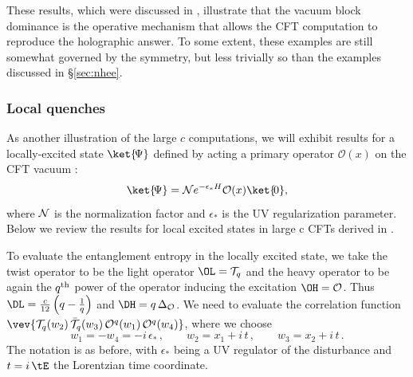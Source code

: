 \documentclass[12pt,openany]{book}
\begin{document}
These results, which were discussed in \cite{Fitzpatrick:2014vua,Asplund:2014coa,Caputa:2014eta}, illustrate that the vacuum block dominance is the operative mechanism that allows the CFT computation to reproduce the holographic answer. To some extent, these examples are still somewhat governed by the symmetry, but less trivially so than the examples discussed in \S\ref{sec:nhee}.


\subsubsection{Local quenches}
\label{sec:lclq}

As another illustration of the large $c$ computations, we will exhibit results for a locally-excited state  $\ket{\!\Psi}$ defined by acting a primary operator $\mathcal{O}(x)$ on the CFT vacuum 
\cite{Nozaki:2014hna,Nozaki:2014uaa,He:2014mwa,Caputa:2014vaa}:
%
\begin{equation}
\ket{\!\Psi}={\cal N}e^{-\epsilon_* H}{\cal O}(x)\ket{\!0},
\end{equation}
%
where ${\cal N}$ is the normalization factor and $\epsilon_{*}$ is the UV regularization parameter. Below we review the results for local excited states in large c CFTs derived in \cite{Asplund:2014coa}.


To evaluate the entanglement entropy in the locally excited state, we take the twist operator to be the light operator
$\OL ={\cal T}_q$ and the heavy operator to be again the $q^{\rm th}$ power of the operator inducing the excitation $\OH = {\cal O}$. Thus $\DL = \frac{c}{12}\left(q-\frac{1}{q}\right)$ and $\DH = q\, \Delta_{\cal O}$. We need to evaluate the correlation function
$\vev{{\cal T}_q(w_2)\, \bar{{\cal T}}_q(w_3)\, {\cal O}^q(w_1)\, {\cal O}^q(w_4)}$, where we choose
%
\begin{equation}
w_1=-w_4=-i\, \epsilon_*\,, \qquad  w_2=x_1+i\, t\,, \qquad w_3=x_2+i\,t \,.
\end{equation}
%
The notation is as before, with $\epsilon_*$ being a UV regulator of the disturbance and $t = i\, \tE$ the Lorentzian time coordinate.
\end{document}
